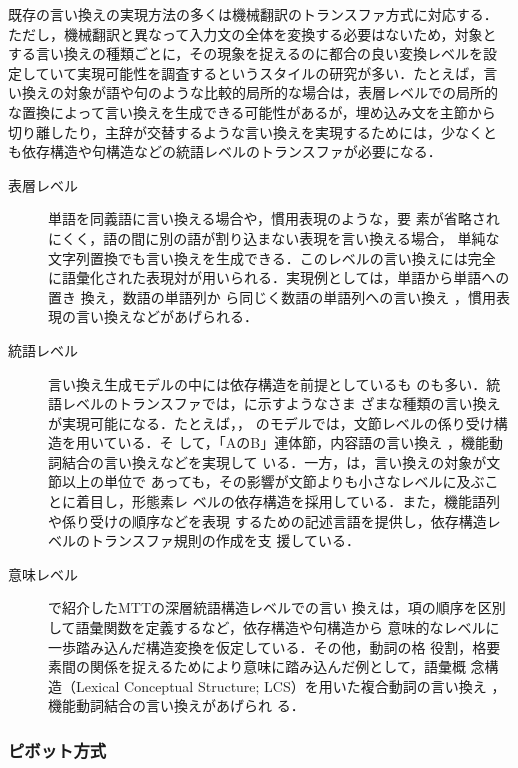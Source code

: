 既存の言い換えの実現方法の多くは機械翻訳のトランスファ方式に対応する．
ただし，機械翻訳と異なって入力文の全体を変換する必要はないため，対象と
する言い換えの種類ごとに，その現象を捉えるのに都合の良い変換レベルを設
定していて実現可能性を調査するというスタイルの研究が多い．たとえば，言
い換えの対象が語や句のような比較的局所的な場合は，表層レベルでの局所的
な置換によって言い換えを生成できる可能性があるが，埋め込み文を主節から
切り離したり，主辞が交替するような言い換えを実現するためには，少なくと
も依存構造や句構造などの統語レベルのトランスファが必要になる．

\begin{description}
\item[表層レベル] 単語を同義語に言い換える場合や，慣用表現のような，要
素が省略されにくく，語の間に別の語が割り込まない表現を言い換える場合，
単純な文字列置換でも言い換えを生成できる．このレベルの言い換えには完全
に語彙化された表現対が用いられる．実現例としては，単語から単語への置き
換え\cite{edmonds:99,fujita:01,lapata:01:b,pearce:01}，数語の単語列か
ら同じく数語の単語列への言い換え
\cite{barzilay:01,barzilay:02,pang:03,shimohata:03:c,quirk:04}，慣用表
現の言い換え\cite{fujita:03:c}などがあげられる．
\item[統語レベル] 言い換え生成モデルの中には依存構造を前提としているも
のも多い．統語レベルのトランスファでは，に示すようなさま
ざまな種類の言い換えが実現可能になる．たとえば，，
のモデルでは，文節レベルの係り受け構造を用いている．そ
して，「AのB」{\lra}連体節\cite{kurohashi:99:b}，内容語の言い換え
\cite{kaji:03:b}，機能動詞結合の言い換え\cite{kaji:04:a}などを実現して
いる．一方，は，言い換えの対象が文節以上の単位で
あっても，その影響が文節よりも小さなレベルに及ぶことに着目し，形態素レ
ベルの依存構造を採用している．また，機能語列や係り受けの順序などを表現
するための記述言語を提供し，依存構造レベルのトランスファ規則の作成を支
援している．
\item[意味レベル] で紹介したMTTの深層統語構造レベルでの言い
換えは，項の順序を区別して語彙関数を定義するなど，依存構造や句構造から
意味的なレベルに一歩踏み込んだ構造変換を仮定している．その他，動詞の格
役割，格要素間の関係を捉えるためにより意味に踏み込んだ例として，語彙概
念構造（Lexical Conceptual Structure; LCS）を用いた複合動詞の言い換え
\cite{takeuchi:02}，機能動詞結合の言い換え\cite{fujita:04:d}があげられ
る．
\end{description}

\subsubsection{ピボット方式}
\label{sssec:pivot}

